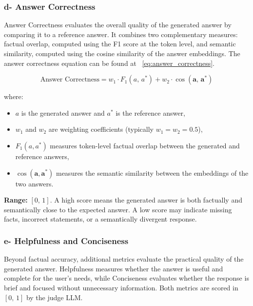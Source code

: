 
\subsubsection{d- Answer Correctness}

Answer Correctness evaluates the overall quality of the generated answer
by comparing it to a reference answer. It combines two complementary
measures: factual overlap, computed using the F1 score at the token level,
and semantic similarity, computed using the cosine similarity of the
answer embeddings. The answer correctness equation can be found at ~\ref{eq:answer_correctness}.

\begin{equation}
\text{Answer Correctness} =
w_1 \cdot F_1\!\left(a,\, a^{*}\right) +
w_2 \cdot \cos\!\left(\mathbf{a},\, \mathbf{a}^{*}\right)
\label{eq:answer_correctness}
\end{equation}

where:
\begin{itemize}
  \item $a$ is the generated answer and $a^{*}$ is the reference answer,
  \item $w_1$ and $w_2$ are weighting coefficients
        (typically $w_1 = w_2 = 0.5$),
  \item $F_1(a, a^{*})$ measures token-level factual overlap between
        the generated and reference answers,
  \item $\cos(\mathbf{a}, \mathbf{a}^{*})$ measures the semantic
        similarity between the embeddings of the two answers.
\end{itemize}

\textbf{Range:} $[0,\,1]$. A high score means the generated answer
is both factually and semantically close to the expected answer.
A low score may indicate missing facts, incorrect statements,
or a semantically divergent response.


\subsubsection{e- Helpfulness and Conciseness}

Beyond factual accuracy, additional metrics evaluate the practical
quality of the generated answer. Helpfulness measures whether the answer
is useful and complete for the user's needs, while Conciseness evaluates
whether the response is brief and focused without unnecessary information.
Both metrics are scored in $[0,\,1]$ by the judge LLM.













